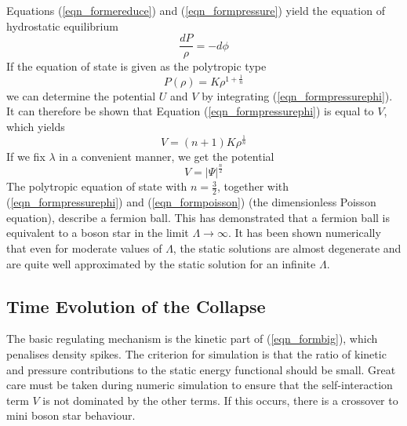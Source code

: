 Equations (\ref{eqn_formereduce}) and (\ref{eqn_formpressure}) yield the equation of hydrostatic equilibrium
\begin{equation}
	\frac{dP}{\rho}=-d\phi
	\label{eqn_formpressurephi}
\end{equation}
If the equation of state is given as the polytropic type
\begin{equation}
	P(\rho)=K\rho^{1+\frac{1}{n}}
	\label{eqn_formpolytropic}
\end{equation}
we can determine the potential $U$ and $V$ by integrating (\ref{eqn_formpressurephi}). It can therefore be shown that
Equation (\ref{eqn_formpressurephi}) is equal to $V$, which yields
\begin{equation}
	V=(n+1)K\rho^{\frac{1}{n}}
	\label{eqn_formvrho}
\end{equation}
If we fix $\lambda$ in a convenient manner, we get the potential
\begin{equation}
	V=|\Psi|^{\frac{n}{2}}
	\label{eqn_formpotential}
\end{equation}
The polytropic equation of state with $n=\frac{3}{2}$, together with (\ref{eqn_formpressurephi}) and (\ref{eqn_formpoisson}) (the dimensionless
Poisson equation), describe a fermion ball. This has demonstrated that a fermion ball is equivalent to a boson star in the limit
$\Lambda \rightarrow \infty$. It has been shown numerically \cite{ref_bosonform} that even for moderate values of $\Lambda$, the static
solutions are almost degenerate and are quite well approximated by the static solution for an infinite $\Lambda$.

\subsection{Time Evolution of the Collapse}
The basic regulating mechanism is the kinetic part of (\ref{eqn_formbig}), which penalises density spikes. The criterion for simulation
is that the ratio of kinetic and pressure contributions to the static energy functional should be small. Great care must be taken during
numeric simulation to ensure that the self-interaction term $V$ is not dominated by the other terms. If this occurs, there is a
crossover to mini boson star behaviour.

